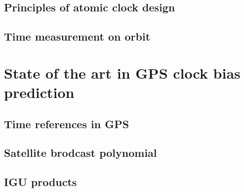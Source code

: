 \subsection{Principles of atomic clock design}

\subsection{Time measurement on orbit}


\section{State of the art in GPS clock bias prediction}

\subsection{Time references in GPS}

\subsection{Satellite brodcast polynomial}

\subsection{IGU products}
